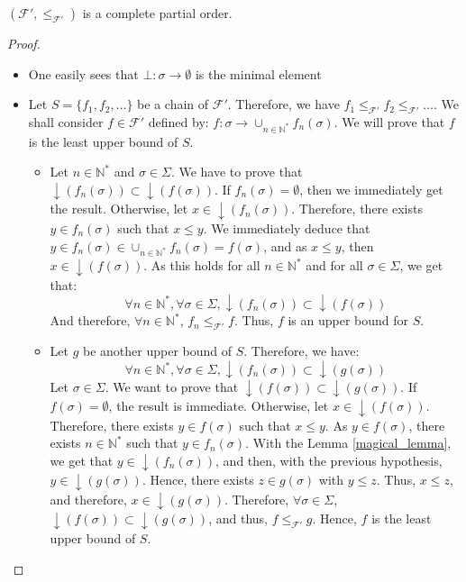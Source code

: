 \documentclass[a4paper,10pt]{llncs}
\def\NN {{\mathbb N}}
\begin{document}
\begin{theorem}
$(\mathcal{F}',\leq_{\mathcal{F}'})$ is a complete partial order.
\end{theorem}
\begin{proof}
\begin{itemize}
\item One easily sees that $\bot : \sigma \rightarrow \emptyset$ is the minimal element
\item Let $S = \{f_1, f_2, \dots \}$ be a chain of $\mathcal{F}'$. Therefore, we have $f_1 \leq_{\mathcal{F}'} f_2 \leq_{\mathcal{F}'} \dots$.\newline
We shall consider $f \in \mathcal{F}'$ defined by: $f : \sigma \rightarrow \cup_{n \in \NN^*} f_n(\sigma)$. We will prove that $f$ is the least upper bound of $S$.
\begin{itemize}
\item Let $n \in \NN^*$ and $\sigma \in \Sigma$. We have to prove that $\downarrow(f_n(\sigma)) \subset \downarrow (f(\sigma))$. If $f_n(\sigma) = \emptyset$, then we immediately get the result.\newline 
Otherwise, let $x \in \downarrow(f_n(\sigma))$. Therefore, there exists $y \in f_n(\sigma)$ such that $x \leq y$. We immediately deduce that $y \in f_n(\sigma) \in \cup_{n \in \NN^*} f_n(\sigma) = f(\sigma)$, and as $x \leq y$, then $x \in \downarrow (f(\sigma))$. As this holds for all $n \in \NN^*$ and for all $\sigma \in \Sigma$, we get that:
$$\forall n \in \NN^*, \forall \sigma \in \Sigma, \downarrow(f_n(\sigma)) \subset \downarrow(f(\sigma))$$
And therefore, $\forall n \in \NN^*$, $f_n \leq_{\mathcal{F}'} f$. Thus, $f$ is an upper bound for $S$.
\item Let $g$ be another upper bound of $S$. Therefore, we have:
$$\forall n \in \NN^*, \forall \sigma \in \Sigma, \downarrow(f_n(\sigma)) \subset \downarrow(g(\sigma))$$
Let $\sigma \in \Sigma$. We want to prove that $\downarrow (f(\sigma)) \subset \downarrow(g(\sigma))$. If $f(\sigma) = \emptyset$, the result is immediate.\newline
Otherwise, let $x \in \downarrow(f(\sigma))$. Therefore, there exists $y \in f(\sigma)$ such that $x \leq y$. As $y \in f(\sigma)$, there exists $n \in \NN^*$ such that $y \in f_n(\sigma)$. With the Lemma \ref{magical_lemma}, we get that $y \in \downarrow(f_n(\sigma))$, and then, with the previous hypothesis, $y \in \downarrow(g(\sigma))$. Hence, there exists $z \in g(\sigma)$ with $y \leq z$. Thus, $x \leq z$, and therefore, $x \in \downarrow(g(\sigma))$.\newline
Therefore, $\forall \sigma \in \Sigma$, $\downarrow(f(\sigma)) \subset \downarrow(g(\sigma))$, and thus, $f \leq_{\mathcal{F}'} g$. Hence, $f$ is the least upper bound of $S$.
\end{itemize} 
\end{itemize}
\end{proof}
\end{document}
